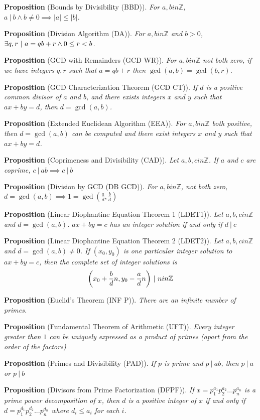 \documentclass[12pt]{article}
\newcommand{\divides}{\ \!|\ \!}
\newcommand{\propositionlist}[2]{{\bf Proposition} (#1). \emph{#2}}
\begin{document}
\propositionlist{Bounds by Divisibility (BBD)}{For $a,b in \mathbb{Z}$, $a\divides b \land b \neq 0 \implies |a| \leq |b|$.}

\propositionlist{Division Algorithm (DA)}{For $a,b in \mathbb{Z}$ and $b > 0$, $\exists q,r \ |\  a = qb + r \land 0 \leq r < b$.}

\propositionlist{GCD with Remainders (GCD WR)}{For $a,b in \mathbb{Z}$ not both zero, if we have integers $q,r$ such that $a = qb + r$ then $\gcd(a,b) = \gcd(b,r)$.}

\propositionlist{GCD Characterization Theorem (GCD CT)}{If $d$ is a positive common divisor of $a$ and $b$, and there exists integers $x$ and $y$ such that $ax + by = d$, then $d = \gcd(a,b)$.}

\propositionlist{Extended Euclidean Algorithm (EEA)}{For $a,b in \mathbb{Z}$ both positive, then $d = \gcd(a,b)$ can be computed and there exist integers $x$ and $y$ such that $ax + by = d$.}

\propositionlist{Coprimeness and Divisibility (CAD)}{Let $a,b,c in \mathbb{Z}$. If $a$ and $c$ are coprime, $c\divides ab \implies c\divides b$}

\propositionlist{Division by GCD (DB GCD)}{For $a,b in \mathbb{Z}$, not both zero, $d = \gcd(a,b) \implies 1 = \gcd(\frac{a}{d},\frac{b}{d})$}

\propositionlist{Linear Diophantine Equation Theorem 1 (LDET1)}{Let $a,b,c in \mathbb{Z}$ and $d = \gcd(a,b)$. $ax + by = c$ has an integer solution if and only if $d\divides c$}

\propositionlist{Linear Diophantine Equation Theorem 2 (LDET2)}{Let $a,b,c in \mathbb{Z}$ and $d = \gcd(a,b) \neq 0$. If $(x_0,y_0)$ is one particular integer solution to $ax + by = c$, then the complete set of integer solutions is \[ \bigg( x_0 + \frac{b}{d}n, y_0 - \frac{a}{d}n \bigg) \ |\  n in \mathbb{Z} \]}

\propositionlist{Euclid's Theorem (INF P)}{There are an infinite number of primes.}

\propositionlist{Fundamental Theorem of Arithmetic (UFT)}{Every integer greater than $1$ can be uniquely expressed as a product of primes (apart from the order of the factors)}

\propositionlist{Primes and Divisibility (PAD)}{If $p$ is prime and $p\divides ab$, then $p\divides a$ or $p\divides b$}

\propositionlist{Divisors from Prime Factorization (DFPF)}{If $x = p_1^{a_1} p_2^{a_2} ... p_n^{a_n}$ is a prime power decomposition of $x$, then $d$ is a positive integer of $x$ if and only if $d = p_1^{d_1} p_2^{d_2} ... p_n^{d_n}$ where $d_i \leq a_i$ for each $i$.}
\end{document}
